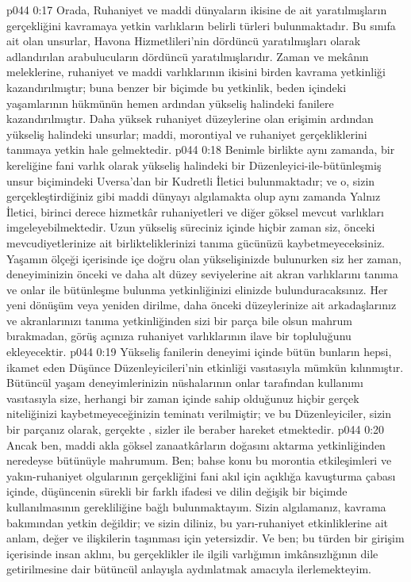 \vs p044 0:17 Orada, Ruhaniyet ve maddi dünyaların ikisine de ait yaratılmışların gerçekliğini kavramaya yetkin varlıkların belirli türleri bulunmaktadır. Bu sınıfa ait olan unsurlar, Havona Hizmetlileri’nin dördüncü yaratılmışları olarak adlandırılan arabulucuların dördüncü yaratılmışlarıdır. Zaman ve mekânın meleklerine, ruhaniyet ve maddi varlıklarının ikisini birden kavrama yetkinliği kazandırılmıştır; buna benzer bir biçimde bu yetkinlik, beden içindeki yaşamlarının hükmünün hemen ardından yükseliş halindeki fanilere kazandırılmıştır. Daha yüksek ruhaniyet düzeylerine olan erişimin ardından yükseliş halindeki unsurlar; maddi, morontiyal ve ruhaniyet gerçekliklerini tanımaya yetkin hale gelmektedir.
\vs p044 0:18 Benimle birlikte aynı zamanda, bir kereliğine fani varlık olarak yükseliş halindeki bir Düzenleyici\hyp{}ile\hyp{}bütünleşmiş unsur biçimindeki Uversa’dan bir Kudretli İletici bulunmaktadır; ve o, sizin gerçekleştirdiğiniz gibi maddi dünyayı algılamakta olup aynı zamanda Yalnız İletici, birinci derece hizmetkâr ruhaniyetleri ve diğer göksel mevcut varlıkları imgeleyebilmektedir. Uzun yükseliş süreciniz içinde hiçbir zaman siz, önceki mevcudiyetlerinize ait birlikteliklerinizi tanıma gücünüzü kaybetmeyeceksiniz. Yaşamın ölçeği içerisinde içe doğru olan yükselişinizde bulunurken siz her zaman, deneyiminizin önceki ve daha alt düzey seviyelerine ait akran varlıklarını tanıma ve onlar ile bütünleşme bulunma yetkinliğinizi elinizde bulunduracaksınız. Her yeni dönüşüm veya yeniden dirilme, daha önceki düzeylerinize ait arkadaşlarınız ve akranlarınızı tanıma yetkinliğinden sizi bir parça bile olsun mahrum bırakmadan, görüş açınıza ruhaniyet varlıklarının ilave bir topluluğunu ekleyecektir.
\vs p044 0:19 Yükseliş fanilerin deneyimi içinde bütün bunların hepsi, ikamet eden Düşünce Düzenleyicileri’nin etkinliği vasıtasıyla mümkün kılınmıştır. Bütüncül yaşam deneyimlerinizin nüshalarının onlar tarafından kullanımı vasıtasıyla size, herhangi bir zaman içinde sahip olduğunuz hiçbir gerçek niteliğinizi kaybetmeyeceğinizin teminatı verilmiştir; ve bu Düzenleyiciler, sizin bir parçanız olarak, gerçekte , sizler ile beraber hareket etmektedir.
\vs p044 0:20 Ancak ben, maddi akla göksel zanaatkârların doğasını aktarma yetkinliğinden neredeyse bütünüyle mahrumum. Ben; bahse konu bu morontia etkileşimleri ve yakın\hyp{}ruhaniyet olgularının gerçekliğini fani akıl için açıklığa kavuşturma çabası içinde, düşüncenin sürekli bir farklı ifadesi ve dilin değişik bir biçimde kullanılmasının gerekliliğine bağlı bulunmaktayım. Sizin algılamanız, kavrama bakımından yetkin değildir; ve sizin diliniz, bu yarı\hyp{}ruhaniyet etkinliklerine ait anlam, değer ve ilişkilerin taşınması için yetersizdir. Ve ben; bu türden bir girişim içerisinde insan aklını, bu gerçeklikler ile ilgili varlığımın imkânsızlığının dile getirilmesine dair bütüncül anlayışla aydınlatmak amacıyla ilerlemekteyim.
